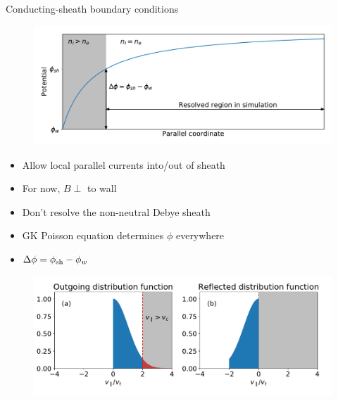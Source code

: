 \documentclass[12pt,table]{beamer}
\begin{document}
\begin{frame}{Conducting-sheath boundary conditions}
\vspace{.5cm}
    \begin{minipage}{.62\textwidth}
        \begin{figure}
        \centering
        \includegraphics[width=\textwidth]{figs/cs-sw.pdf}
        \end{figure}
    \end{minipage}%
    \begin{minipage}{.35\textwidth} \scriptsize
        \begin{itemize}
            \item Allow local parallel currents into/out of sheath
            \item For now, $B \perp$ to wall%
            \item Don't resolve the non-neutral Debye sheath 
            \item GK Poisson equation determines $\phi$ everywhere
            \item $\Delta \phi = \phi_{\rm sh} - \phi_w$
        \end{itemize}
    \end{minipage}
    \begin{minipage}{.62\textwidth}
    \vspace{.5cm}
    \begin{figure}
        \centering
        \includegraphics[width=\textwidth]{figs/dist-f-cs.pdf}

\end{figure}
\end{minipage}
\end{frame}
\end{document}
